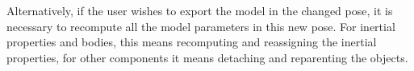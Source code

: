 \documentclass{article}
\begin{document}
Alternatively, if the user wishes to export the model in the changed pose, it is necessary to recompute all the model parameters in this new pose. For inertial properties and bodies, this means recomputing and reassigning the inertial properties, for other components it means detaching and reparenting the objects.


\end{document}
